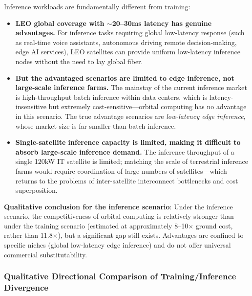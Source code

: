 Inference workloads are fundamentally different from training:

\begin{itemize}[leftmargin=*]
    \item \textbf{LEO global coverage with $\sim$20--30\;ms latency has genuine advantages.} For inference tasks requiring global low-latency response (such as real-time voice assistants, autonomous driving remote decision-making, edge AI services), LEO satellites can provide uniform low-latency inference nodes without the need to lay global fiber.
    \item \textbf{But the advantaged scenarios are limited to edge inference, not large-scale inference farms.} The mainstay of the current inference market is high-throughput batch inference within data centers, which is latency-insensitive but extremely cost-sensitive---orbital computing has no advantage in this scenario. The true advantage scenarios are \emph{low-latency edge inference}, whose market size is far smaller than batch inference.
    \item \textbf{Single-satellite inference capacity is limited, making it difficult to absorb large-scale inference demand.} The inference throughput of a single 120\;kW IT satellite is limited; matching the scale of terrestrial inference farms would require coordination of large numbers of satellites---which returns to the problems of inter-satellite interconnect bottlenecks and cost superposition.
\end{itemize}

\textbf{Qualitative conclusion for the inference scenario}: Under the inference scenario, the competitiveness of orbital computing is relatively stronger than under the training scenario (estimated at approximately 8--10$\times$ ground cost, rather than 11.8$\times$), but a significant gap still exists. Advantages are confined to specific niches (global low-latency edge inference) and do not offer universal commercial substitutability.

\subsubsection{Qualitative Directional Comparison of Training/Inference Divergence}

